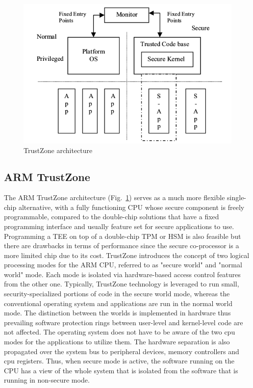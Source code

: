 \documentclass[cameraready]{cseminar}
\begin{document}
\begin{figure}[t]
  \begin{center}
    \includegraphics[width=.5\textwidth]{figures/trustzone_arch}
    \caption{TrustZone architecture\cite{epassdrm}}
    \label{fig:trustzone_arch}
  \end{center}
\end{figure}

\subsection{ARM TrustZone}
\label{armtrustzone}

The ARM TrustZone architecture (Fig.~\ref{fig:trustzone_arch}) serves as a much more flexible single-chip alternative, with a fully functioning CPU whose secure component is freely programmable, compared to the double-chip solutions that have a fixed programming interface and usually feature set for secure applications to use. Programming a TEE on top of a double-chip TPM or HSM is also feasible but there are drawbacks in terms of performance since the secure co-processor is a more limited chip due to its cost.
TrustZone introduces the concept of two logical processing modes for the ARM CPU, referred to as "secure world" and "normal world" mode. Each mode is isolated via hardware-based access control features from the other one. Typically, TrustZone technology is leveraged to run small, security-specialized portions of code in the secure world mode, whereas the conventional operating system and applications are run in the normal world mode.
The distinction between the worlds is implemented in hardware thus prevailing software protection rings between user-level and kernel-level code are not affected. The operating system does not have to be aware of the two cpu modes for the applications to utilize them. The hardware separation is also propagated over the system bus to peripheral devices, memory controllers and cpu registers. Thus, when secure mode is active, the software running on the CPU has a view of the whole system that is isolated from the software that is running in non-secure mode.
\end{document}
